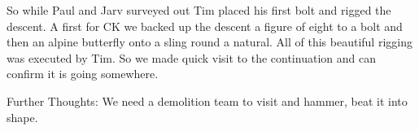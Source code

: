 So while Paul and Jarv surveyed out Tim placed his first bolt and rigged
the descent. A first for CK we backed up the descent a figure of eight
to a bolt and then an alpine butterfly onto a sling round a natural. All
of this beautiful rigging was executed by Tim. So we made quick visit to
the continuation and can confirm it is going somewhere.

Further Thoughts: We need a demolition team to visit  and hammer,
beat it into shape.

